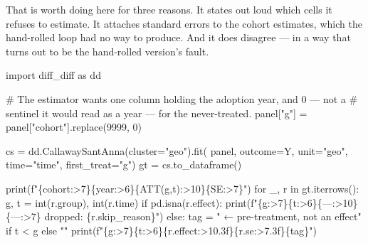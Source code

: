 \documentclass[
  letterpaper,
  10pt,
  twoside,
  openright,
  numbers=noenddot,
  chapterprefix=true]{scrbook}
\newenvironment{Shaded}{}{}
\newcommand{\BuiltInTok}[1]{\textcolor[rgb]{0.84,0.23,0.29}{#1}}
\newcommand{\CommentTok}[1]{\textcolor[rgb]{0.42,0.45,0.49}{#1}}
\newcommand{\ControlFlowTok}[1]{\textcolor[rgb]{0.84,0.23,0.29}{#1}}
\newcommand{\DecValTok}[1]{\textcolor[rgb]{0.00,0.36,0.77}{#1}}
\newcommand{\ImportTok}[1]{\textcolor[rgb]{0.01,0.18,0.38}{#1}}
\newcommand{\KeywordTok}[1]{\textcolor[rgb]{0.84,0.23,0.29}{#1}}
\newcommand{\NormalTok}[1]{\textcolor[rgb]{0.14,0.16,0.18}{#1}}
\newcommand{\OperatorTok}[1]{\textcolor[rgb]{0.14,0.16,0.18}{#1}}
\newcommand{\SpecialCharTok}[1]{\textcolor[rgb]{0.00,0.36,0.77}{#1}}
\newcommand{\SpecialStringTok}[1]{\textcolor[rgb]{0.01,0.18,0.38}{#1}}
\newcommand{\StringTok}[1]{\textcolor[rgb]{0.01,0.18,0.38}{#1}}
\begin{document}
That is worth doing here for three reasons. It states out loud which
cells it refuses to estimate. It attaches standard errors to the cohort
estimates, which the hand-rolled loop had no way to produce. And it does
disagree --- in a way that turns out to be the hand-rolled version's
fault.

\label{check-cs}
\begin{Shaded}
\begin{Highlighting}[]
\ImportTok{import}\NormalTok{ diff\_diff }\ImportTok{as}\NormalTok{ dd}

\CommentTok{\# The estimator wants one column holding the adoption year, and 0 — not a}
\CommentTok{\# sentinel it would read as a year — for the never{-}treated.}
\NormalTok{panel[}\StringTok{"g"}\NormalTok{] }\OperatorTok{=}\NormalTok{ panel[}\StringTok{"cohort"}\NormalTok{].replace(}\DecValTok{9999}\NormalTok{, }\DecValTok{0}\NormalTok{)}

\NormalTok{cs }\OperatorTok{=}\NormalTok{ dd.CallawaySantAnna(cluster}\OperatorTok{=}\StringTok{"geo"}\NormalTok{).fit(}
\NormalTok{    panel, outcome}\OperatorTok{=}\NormalTok{Y, unit}\OperatorTok{=}\StringTok{"geo"}\NormalTok{, time}\OperatorTok{=}\StringTok{"time"}\NormalTok{, first\_treat}\OperatorTok{=}\StringTok{"g"}\NormalTok{)}
\NormalTok{gt }\OperatorTok{=}\NormalTok{ cs.to\_dataframe()}

\BuiltInTok{print}\NormalTok{(}\SpecialStringTok{f"}\SpecialCharTok{\{}\StringTok{\textquotesingle{}cohort\textquotesingle{}}\SpecialCharTok{:\textgreater{}7\}\{}\StringTok{\textquotesingle{}year\textquotesingle{}}\SpecialCharTok{:\textgreater{}6\}\{}\StringTok{\textquotesingle{}ATT(g,t)\textquotesingle{}}\SpecialCharTok{:\textgreater{}10\}\{}\StringTok{\textquotesingle{}SE\textquotesingle{}}\SpecialCharTok{:\textgreater{}7\}}\SpecialStringTok{"}\NormalTok{)}
\ControlFlowTok{for}\NormalTok{ \_, r }\KeywordTok{in}\NormalTok{ gt.iterrows():}
\NormalTok{    g, t }\OperatorTok{=} \BuiltInTok{int}\NormalTok{(r.group), }\BuiltInTok{int}\NormalTok{(r.time)}
    \ControlFlowTok{if}\NormalTok{ pd.isna(r.effect):}
        \BuiltInTok{print}\NormalTok{(}\SpecialStringTok{f"}\SpecialCharTok{\{}\NormalTok{g}\SpecialCharTok{:\textgreater{}7\}\{}\NormalTok{t}\SpecialCharTok{:\textgreater{}6\}\{}\StringTok{\textquotesingle{}—\textquotesingle{}}\SpecialCharTok{:\textgreater{}10\}\{}\StringTok{\textquotesingle{}—\textquotesingle{}}\SpecialCharTok{:\textgreater{}7\}}\SpecialStringTok{   dropped: }\SpecialCharTok{\{}\NormalTok{r}\SpecialCharTok{.}\NormalTok{skip\_reason}\SpecialCharTok{\}}\SpecialStringTok{"}\NormalTok{)}
    \ControlFlowTok{else}\NormalTok{:}
\NormalTok{        tag }\OperatorTok{=} \StringTok{"  ← pre{-}treatment, not an effect"} \ControlFlowTok{if}\NormalTok{ t }\OperatorTok{\textless{}}\NormalTok{ g }\ControlFlowTok{else} \StringTok{""}
        \BuiltInTok{print}\NormalTok{(}\SpecialStringTok{f"}\SpecialCharTok{\{}\NormalTok{g}\SpecialCharTok{:\textgreater{}7\}\{}\NormalTok{t}\SpecialCharTok{:\textgreater{}6\}\{}\NormalTok{r}\SpecialCharTok{.}\NormalTok{effect}\SpecialCharTok{:\textgreater{}10.3f\}\{}\NormalTok{r}\SpecialCharTok{.}\NormalTok{se}\SpecialCharTok{:\textgreater{}7.3f\}\{}\NormalTok{tag}\SpecialCharTok{\}}\SpecialStringTok{"}\NormalTok{)}


\end{Highlighting}
\end{Shaded}
\end{document}

